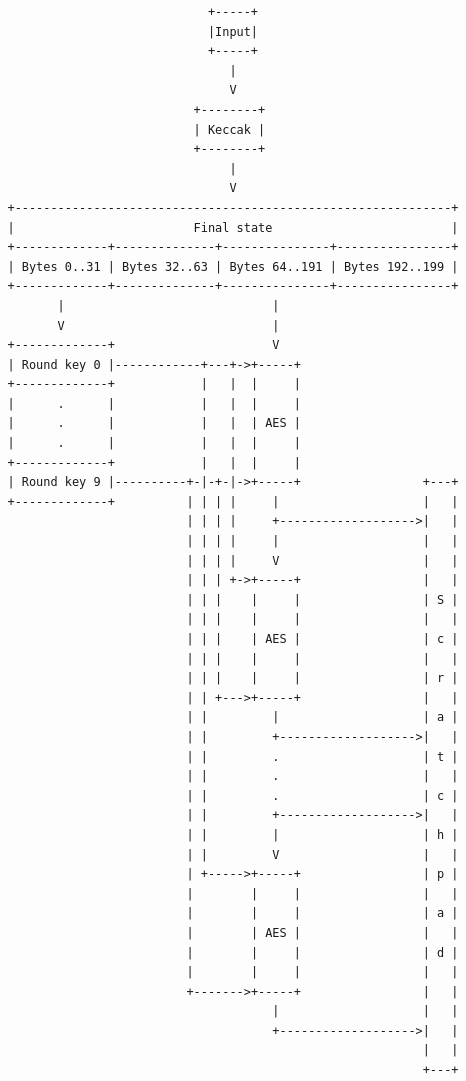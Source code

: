 \begin{verbatim}
                               +-----+
                               |Input|
                               +-----+
                                  |
                                  V
                             +--------+
                             | Keccak |
                             +--------+
                                  |
                                  V
   +-------------------------------------------------------------+
   |                         Final state                         |
   +-------------+--------------+---------------+----------------+
   | Bytes 0..31 | Bytes 32..63 | Bytes 64..191 | Bytes 192..199 |
   +-------------+--------------+---------------+----------------+
          |                             |
          V                             |
   +-------------+                      V
   | Round key 0 |------------+---+->+-----+
   +-------------+            |   |  |     |
   |      .      |            |   |  |     |
   |      .      |            |   |  | AES |
   |      .      |            |   |  |     |
   +-------------+            |   |  |     |
   | Round key 9 |----------+-|-+-|->+-----+                 +---+
   +-------------+          | | | |     |                    |   |
                            | | | |     +------------------->|   |
                            | | | |     |                    |   |
                            | | | |     V                    |   |
                            | | | +->+-----+                 |   |
                            | | |    |     |                 | S |
                            | | |    |     |                 |   |
                            | | |    | AES |                 | c |
                            | | |    |     |                 |   |
                            | | |    |     |                 | r |
                            | | +--->+-----+                 |   |
                            | |         |                    | a |
                            | |         +------------------->|   |
                            | |         .                    | t |
                            | |         .                    |   |
                            | |         .                    | c |
                            | |         +------------------->|   |
                            | |         |                    | h |
                            | |         V                    |   |
                            | +----->+-----+                 | p |
                            |        |     |                 |   |
                            |        |     |                 | a |
                            |        | AES |                 |   |
                            |        |     |                 | d |
                            |        |     |                 |   |
                            +------->+-----+                 |   |
                                        |                    |   |
                                        +------------------->|   |
                                                             |   |
                                                             +---+
\end{verbatim}

